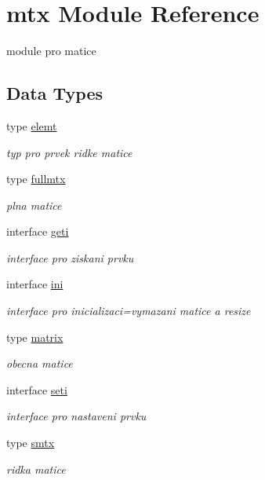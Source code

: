 \hypertarget{classmtx}{\section{mtx \-Module \-Reference}
\label{classmtx}
}


module pro matice  


\subsection*{\-Data \-Types}
\begin{DoxyCompactItemize}
\item 
type \hyperlink{structmtx_1_1elemt}{elemt}
\begin{DoxyCompactList}\small\item\em typ pro prvek ridke matice \end{DoxyCompactList}\item 
type \hyperlink{structmtx_1_1fullmtx}{fullmtx}
\begin{DoxyCompactList}\small\item\em plna matice \end{DoxyCompactList}\item 
interface \hyperlink{interfacemtx_1_1geti}{geti}
\begin{DoxyCompactList}\small\item\em interface pro ziskani prvku \end{DoxyCompactList}\item 
interface \hyperlink{interfacemtx_1_1ini}{ini}
\begin{DoxyCompactList}\small\item\em interface pro inicializaci=vymazani matice a resize \end{DoxyCompactList}\item 
type \hyperlink{structmtx_1_1matrix}{matrix}
\begin{DoxyCompactList}\small\item\em obecna matice \end{DoxyCompactList}\item 
interface \hyperlink{interfacemtx_1_1seti}{seti}
\begin{DoxyCompactList}\small\item\em interface pro nastaveni prvku \end{DoxyCompactList}\item 
type \hyperlink{structmtx_1_1smtx}{smtx}
\begin{DoxyCompactList}\small\item\em ridka matice \end{DoxyCompactList}\end{DoxyCompactItemize}
